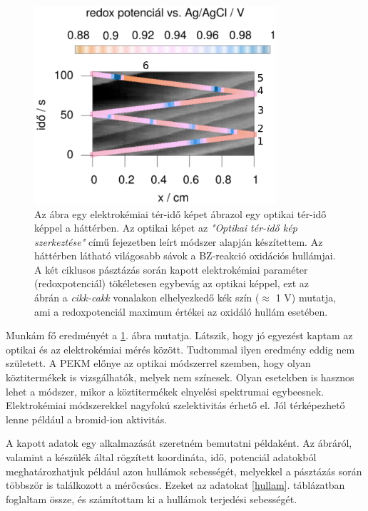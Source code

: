 \begin{figure}[!h]
\centering
\includegraphics[width=0.8\textwidth]{img/spacetime2.eps}
\caption{Az ábra egy elektrokémiai tér-idő képet ábrazol egy optikai tér-idő képpel a háttérben. Az optikai képet az \emph{"Optikai tér-idő kép szerkeztése"} című fejezetben leírt módszer alapján készítettem. Az háttérben látható világosabb sávok a BZ-reakció oxidációs hullámjai. A két ciklusos pásztázás során kapott elektrokémiai paraméter (redoxpotenciál) tökéletesen egybevág az optikai képpel, ezt az ábrán a \emph{cikk-cakk} vonalakon elhelyezkedő kék szín ($\approx$ 1 V) mutatja, ami a redoxpotenciál maximum értékei az oxidáló hullám esetében.}
\label{fig:spatiotemporal}
\end{figure}
Munkám fő eredményét a \ref{fig:spatiotemporal}. ábra mutatja. Látszik, hogy jó egyezést kaptam az optikai és az elektrokémiai mérés között. Tudtommal ilyen eredmény eddig nem született. A PEKM előnye az optikai módszerrel szemben, hogy olyan köztitermékek is vizsgálhatók, melyek nem színesek. Olyan esetekben is hasznos lehet a módszer, mikor a köztitermékek elnyelési spektrumai egybeesnek. Elektrokémiai módszerekkel nagyfokú szelektivitás érhető el. Jól térképezhető lenne például a bromid-ion aktivitás.

A kapott adatok egy alkalmazását szeretném bemutatni példaként. Az ábráról, valamint a készülék által rögzített koordináta, idő, potenciál adatokból meghatározhatjuk például azon hullámok sebességét, melyekkel a pásztázás során többször is találkozott a mérőcsúcs. Ezeket az adatokat \ref{hullam}. táblázatban foglaltam össze, és számítottam ki a hullámok terjedési sebességét.

